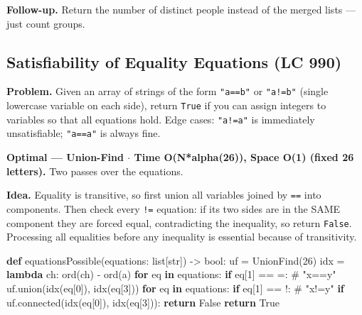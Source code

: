 \documentclass[11pt]{article}
\newenvironment{Shaded}{\begin{snugshade}}{\end{snugshade}}
\newcommand{\BuiltInTok}[1]{\textcolor[rgb]{0.50,0.55,0.55}{#1}}
\newcommand{\CommentTok}[1]{\textcolor[rgb]{0.48,0.49,0.49}{#1}}
\newcommand{\ControlFlowTok}[1]{\textcolor[rgb]{0.99,0.74,0.29}{\textbf{#1}}}
\newcommand{\DecValTok}[1]{\textcolor[rgb]{0.96,0.45,0.00}{#1}}
\newcommand{\KeywordTok}[1]{\textcolor[rgb]{0.81,0.81,0.76}{\textbf{#1}}}
\newcommand{\NormalTok}[1]{\textcolor[rgb]{0.81,0.81,0.76}{#1}}
\newcommand{\OperatorTok}[1]{\textcolor[rgb]{0.81,0.81,0.76}{#1}}
\newcommand{\StringTok}[1]{\textcolor[rgb]{0.96,0.31,0.31}{#1}}
\newcommand{\VariableTok}[1]{\textcolor[rgb]{0.15,0.68,0.68}{#1}}
\begin{document}
\textbf{Follow-up.} Return the number of distinct people instead of the merged lists --- just count groups.

\subsection{Satisfiability of Equality Equations (LC 990)}\label{satisfiability-of-equality-equations-lc-990}

\textbf{Problem.} Given an array of strings of the form \texttt{"a==b"} or \texttt{"a!=b"} (single lowercase variable on each side), return \texttt{True} if you can assign integers to variables so that all equations hold. Edge cases: \texttt{"a!=a"} is immediately unsatisfiable; \texttt{"a==a"} is always fine.

\textbf{Optimal --- Union-Find \(\cdot\) Time O(N*alpha(26)), Space O(1) (fixed 26 letters).} Two passes over the equations.

\textbf{Idea.} Equality is transitive, so first union all variables joined by \texttt{==} into components. Then check every \texttt{!=} equation: if its two sides are in the SAME component they are forced equal, contradicting the inequality, so return \texttt{False}. Processing all equalities before any inequality is essential because of transitivity.


\begin{Shaded}
\begin{Highlighting}[]
\KeywordTok{def}\NormalTok{ equationsPossible(equations: }\BuiltInTok{list}\NormalTok{[}\BuiltInTok{str}\NormalTok{]) }\OperatorTok{{-}\textgreater{}} \BuiltInTok{bool}\NormalTok{:}
\NormalTok{    uf }\OperatorTok{=}\NormalTok{ UnionFind(}\DecValTok{26}\NormalTok{)}
\NormalTok{    idx }\OperatorTok{=} \KeywordTok{lambda}\NormalTok{ ch: }\BuiltInTok{ord}\NormalTok{(ch) }\OperatorTok{{-}} \BuiltInTok{ord}\NormalTok{(}\StringTok{\textquotesingle{}a\textquotesingle{}}\NormalTok{)}
    \ControlFlowTok{for}\NormalTok{ eq }\KeywordTok{in}\NormalTok{ equations:}
        \ControlFlowTok{if}\NormalTok{ eq[}\DecValTok{1}\NormalTok{] }\OperatorTok{==} \StringTok{\textquotesingle{}=\textquotesingle{}}\NormalTok{:                       }\CommentTok{\# "x==y"}
\NormalTok{            uf.union(idx(eq[}\DecValTok{0}\NormalTok{]), idx(eq[}\DecValTok{3}\NormalTok{]))}
    \ControlFlowTok{for}\NormalTok{ eq }\KeywordTok{in}\NormalTok{ equations:}
        \ControlFlowTok{if}\NormalTok{ eq[}\DecValTok{1}\NormalTok{] }\OperatorTok{==} \StringTok{\textquotesingle{}!\textquotesingle{}}\NormalTok{:                       }\CommentTok{\# "x!=y"}
            \ControlFlowTok{if}\NormalTok{ uf.connected(idx(eq[}\DecValTok{0}\NormalTok{]), idx(eq[}\DecValTok{3}\NormalTok{])):}
                \ControlFlowTok{return} \VariableTok{False}
    \ControlFlowTok{return} \VariableTok{True}
\end{Highlighting}
\end{Shaded}
\end{document}
